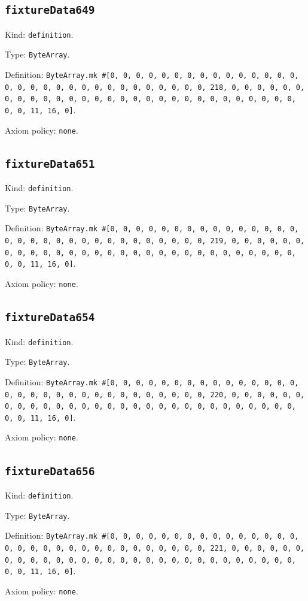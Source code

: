 \documentclass[11pt]{article}
\begin{document}
\subsection*{\texttt{fixtureData649}}
\noindent Kind: \texttt{definition}.\par
\noindent Type: \texttt{ByteArray}.\par
\noindent Definition: \texttt{ByteArray.mk \#[0, 0, 0, 0, 0, 0, 0, 0, 0, 0, 0, 0, 0, 0, 0, 0, 0, 0, 0, 0, 0, 0, 0, 0, 0, 0, 0, 0, 0, 0, 0, 218, 0, 0, 0, 0, 0, 0, 0, 0, 0, 0, 0, 0, 0, 0, 0, 0, 0, 0, 0, 0, 0, 0, 0, 0, 0, 0, 0, 0, 0, 0, 0, 11, 16, 0]}.\par
\noindent Axiom policy: \texttt{none}.\par
\subsection*{\texttt{fixtureData651}}
\noindent Kind: \texttt{definition}.\par
\noindent Type: \texttt{ByteArray}.\par
\noindent Definition: \texttt{ByteArray.mk \#[0, 0, 0, 0, 0, 0, 0, 0, 0, 0, 0, 0, 0, 0, 0, 0, 0, 0, 0, 0, 0, 0, 0, 0, 0, 0, 0, 0, 0, 0, 0, 219, 0, 0, 0, 0, 0, 0, 0, 0, 0, 0, 0, 0, 0, 0, 0, 0, 0, 0, 0, 0, 0, 0, 0, 0, 0, 0, 0, 0, 0, 0, 0, 11, 16, 0]}.\par
\noindent Axiom policy: \texttt{none}.\par
\subsection*{\texttt{fixtureData654}}
\noindent Kind: \texttt{definition}.\par
\noindent Type: \texttt{ByteArray}.\par
\noindent Definition: \texttt{ByteArray.mk \#[0, 0, 0, 0, 0, 0, 0, 0, 0, 0, 0, 0, 0, 0, 0, 0, 0, 0, 0, 0, 0, 0, 0, 0, 0, 0, 0, 0, 0, 0, 0, 220, 0, 0, 0, 0, 0, 0, 0, 0, 0, 0, 0, 0, 0, 0, 0, 0, 0, 0, 0, 0, 0, 0, 0, 0, 0, 0, 0, 0, 0, 0, 0, 11, 16, 0]}.\par
\noindent Axiom policy: \texttt{none}.\par
\subsection*{\texttt{fixtureData656}}
\noindent Kind: \texttt{definition}.\par
\noindent Type: \texttt{ByteArray}.\par
\noindent Definition: \texttt{ByteArray.mk \#[0, 0, 0, 0, 0, 0, 0, 0, 0, 0, 0, 0, 0, 0, 0, 0, 0, 0, 0, 0, 0, 0, 0, 0, 0, 0, 0, 0, 0, 0, 0, 221, 0, 0, 0, 0, 0, 0, 0, 0, 0, 0, 0, 0, 0, 0, 0, 0, 0, 0, 0, 0, 0, 0, 0, 0, 0, 0, 0, 0, 0, 0, 0, 11, 16, 0]}.\par
\noindent Axiom policy: \texttt{none}.\par
\end{document}
